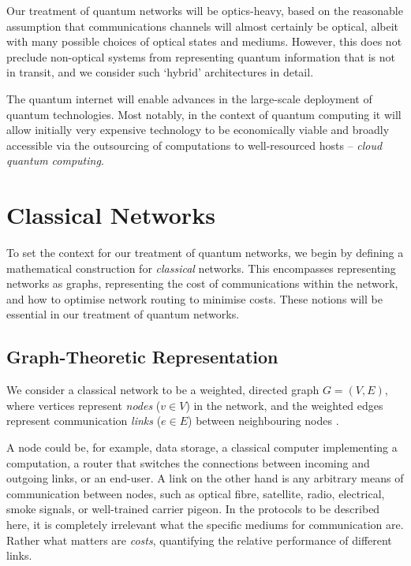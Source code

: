 \documentclass[aps,rmp,twocolumn,amsmath,amssymb,nofootinbib,superscriptaddress]{revtex4}
\begin{document}
Our treatment of quantum networks will be optics-heavy, based on the reasonable assumption that communications channels will almost certainly be optical, albeit with many possible choices of optical states and mediums. However, this does not preclude non-optical systems from representing quantum information that is not in transit, and we consider such `hybrid' architectures in detail.

The quantum internet will enable advances in the large-scale deployment of quantum technologies. Most notably, in the context of quantum computing it will allow initially very expensive technology to be economically viable and broadly accessible via the outsourcing of computations to well-resourced hosts -- \emph{cloud quantum computing}.

%
%

\section{Classical Networks}

To set the context for our treatment of quantum networks, we begin by defining a mathematical construction for \emph{classical} networks. This encompasses representing networks as graphs, representing the cost of communications within the network, and how to optimise network routing to minimise costs. These notions will be essential in our treatment of quantum networks.

%
%

\subsection{Graph-Theoretic Representation}

We consider a classical network to be a weighted, directed graph \mbox{$G=(V,E)$}, where vertices represent \emph{nodes} (\mbox{$v\in V$}) in the network, and the weighted edges represent communication \emph{links} (\mbox{$e\in E$}) between neighbouring nodes \cite{???}.

A node could be, for example, data storage, a classical computer implementing a computation, a router that switches the connections between incoming and outgoing links, or an end-user. A link on the other hand is any arbitrary means of communication between nodes, such as optical fibre, satellite, radio, electrical, smoke signals, or well-trained carrier pigeon. In the protocols to be described here, it is completely irrelevant what the specific mediums for communication are. Rather what matters are \emph{costs}, quantifying the relative performance of different links.
\end{document}
